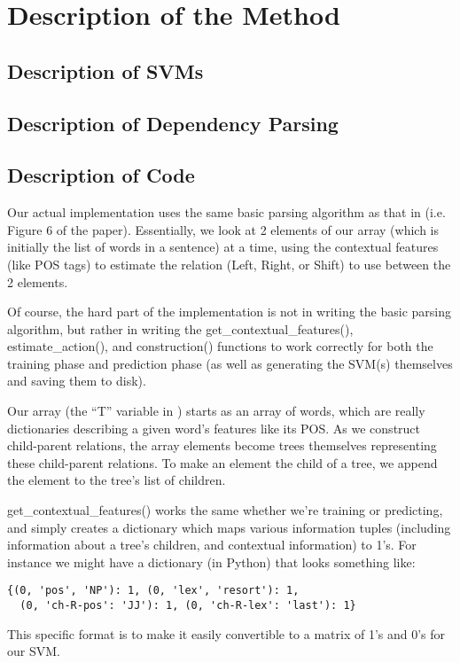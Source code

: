\documentclass[12pt,fleqn]{amsart}
\begin{document}
\section{Description of the Method}

\subsection{Description of SVMs}
\subsection{Description of Dependency Parsing}
\subsection{Description of Code}
Our actual implementation uses the same basic parsing algorithm as that in 
\cite{original-paper} (i.e. Figure 6 of the paper). Essentially, we look at
2 elements of our array (which is initially the list of words in a sentence)
at a time, using the contextual features (like POS tags) to estimate
the relation (Left, Right, or Shift) to use between the 2 elements. 

Of course, the hard part of the implementation is not in writing the basic 
parsing algorithm, but
rather in writing the get\_contextual\_features(), estimate\_action(),
and construction() functions
to work correctly for both the training phase and prediction phase (as well
as generating the SVM(s) themselves and saving them to disk).

Our array (the ``T'' variable in \cite{original-paper}) 
starts as an array of words, which are really
dictionaries describing a given word's features like its POS. As we construct
child-parent relations, the array elements become trees themselves representing
these child-parent relations. To make an element the child of a tree, we append 
the element to the tree's list of children.

get\_contextual\_features() works the same whether we're training or predicting,
and simply creates a dictionary which maps various information tuples 
(including information about a tree's children, and contextual information) to
1's. For instance we might have a dictionary (in Python) that looks something 
like:
\begin{verbatim}
{(0, 'pos', 'NP'): 1, (0, 'lex', 'resort'): 1,
  (0, 'ch-R-pos': 'JJ'): 1, (0, 'ch-R-lex': 'last'): 1}
\end{verbatim}
This specific format is to make it easily convertible to a matrix of 1's and 
0's for our SVM.
\end{document}
